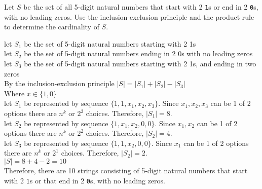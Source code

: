 \documentclass[solution,letterpaper]{cs20}
\begin{document}
\begin{problem}
    Let $S$ be the set of all 5-digit natural numbers that start with 2 \texttt{1}s or
    end in 2 \texttt{0}s, with no leading zeros. Use the inclusion-exclusion principle
    and the product rule to determine the cardinality of $S$.
    \begin{solution}
        let $S_1$ be the set of 5-digit natural numbers starting with 2 1s \\
        let $S_2$ be the set of 5-digit natural numbers ending in 2 0s with no leading zeros\\
        let $S_3$ be the set of 5-digit natural numbers starting with 2 1s, and ending in two zeros \\
        By the inclusion-exclusion principle $|S| = |S_1| + |S_2| - |S_3|$ \\

        Where $x \in \{1, 0\}$ \\
        let $S_1$ be represented by sequence $\{1,1,x_1, x_2, x_3\}$. Since $x_1, x_2, x_3$ can be 1 of 2 options there are $n^k \text{ or } 2^3$ choices. Therefore, $|S_1| = 8$. \\
        let $S_2$ be represented by sequence $\{1,x_1, x_2, 0, 0\}$. Since $x_1, x_2$ can be 1 of 2 options there are $n^k \text{ or } 2^2$ choices. Therefore, $|S_2| = 4$. \\
        let $S_3$ be represented by sequence $\{1,1, x_2, 0, 0\}$. Since $x_1$ can be 1 of 2 options there are $n^k \text{ or } 2^1$ choices. Therefore, $|S_2| = 2$. \\

        $|S| = 8 + 4 - 2 = 10$ \\
        Therefore, there are 10 strings consisting of 5-digit natural numbers that start with 2 \texttt{1}s or that end in 2 \texttt{0}s, with no leading zeros. \\
    \end{solution}
\end{problem}
\newpage
\end{document}
